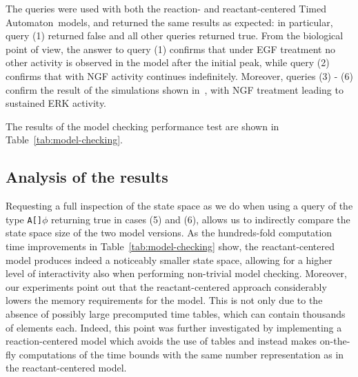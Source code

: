 \documentclass{llncs}
\newcommand{\ta}{Timed Automaton}
\begin{document}
The queries were used with both the reaction- and reactant-centered \ta\ models,
and returned the same results as expected: in particular, query (1) returned false and all other queries returned true.
From the biological point of view, the answer to query (1) confirms that under EGF treatment no other activity is observed in the model after the initial peak,
while query (2) confirms that with NGF activity continues indefinitely.
Moreover, queries (3) - (6) confirm the result of the simulations shown in~\cite{animo-ieee}, with NGF treatment leading to sustained ERK activity.

The results of the model checking performance test are shown in Table~\ref{tab:model-checking}.


\subsection{Analysis of the results}
Requesting a full inspection of the state space
as we do when using a query of the type {\tt A[]$\phi$} returning true in cases (5) and (6), allows us to indirectly compare the state space size of the two
model versions. As the hundreds-fold computation time improvements in Table~\ref{tab:model-checking} show, the reactant-centered model produces
indeed a noticeably smaller state space, allowing for a higher level of interactivity also when performing non-trivial model checking.
Moreover, our experiments point out that the reactant-centered approach considerably lowers the memory
requirements for the model. This is not only due to the absence of possibly large precomputed time tables,
which can contain thousands of elements each.
Indeed, this point was further investigated by implementing a reaction-centered model which
avoids the use of tables and instead makes on-the-fly computations of the time bounds with the same number representation as in the reactant-centered model.
\end{document}
